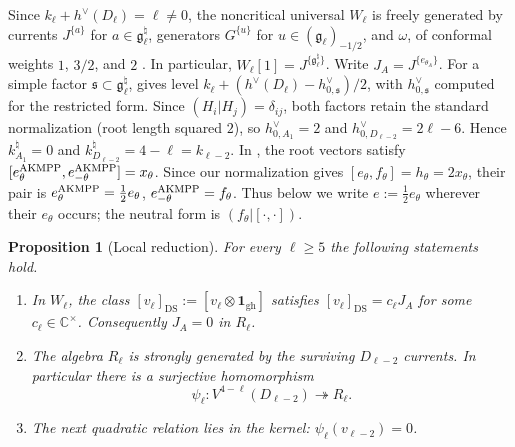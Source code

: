 \documentclass[11pt]{article}
\newtheorem{proposition}[theorem]{Proposition}
\newcommand{\g}{\mathfrak g}
\begin{document}
Since $k_\ell+h^\vee(D_\ell)=\ell\ne0$, the noncritical universal
$W_\ell$ is freely generated by currents $J^{\{a\}}$ for
$a\in\g_\ell^\natural$, generators $G^{\{u\}}$ for
$u\in(\g_\ell)_{-1/2}$, and $\omega$, of conformal weights $1$, $3/2$,
and $2$ \cite[p.~2 and Theorem~2.1]{AKMPPStructural}.  In particular,
$W_\ell[1]=J^{\{\g_\ell^\natural\}}$.  Write
$J_A=J^{\{e_{\theta_A}\}}$.
For a simple factor $\mathfrak s\subset\g_\ell^\natural$,
\cite[Theorem~2.1]{AKMPPStructural} gives level
$k_\ell+(h^\vee(D_\ell)-h^\vee_{0,\mathfrak s})/2$, with
$h^\vee_{0,\mathfrak s}$ computed for the restricted form.  Since
$(H_i|H_j)=\delta_{ij}$, both factors retain the standard normalization
(root length squared $2$), so $h^\vee_{0,A_1}=2$ and
$h^\vee_{0,D_{\ell-2}}=2\ell-6$.  Hence
$k^\natural_{A_1}=0$ and
$k^\natural_{D_{\ell-2}}=4-\ell=k_{\ell-2}$.
In \cite[\S2]{AKMPPStructural}, the root vectors satisfy
$[e_\theta^{\rm AKMPP},e_{-\theta}^{\rm AKMPP}]=x_\theta$.  Since our
normalization gives $[e_\theta,f_\theta]=h_\theta=2x_\theta$, their pair is
$e_\theta^{\rm AKMPP}=\tfrac12e_\theta$, $e_{-\theta}^{\rm AKMPP}=f_\theta$.
Thus below we write $e:=\tfrac12e_\theta$ wherever their $e_\theta$ occurs;
the neutral form is $(f_\theta|[\cdot,\cdot])$.

\begin{proposition}[Local reduction]\label{prop:local-reduction}
For every $\ell\ge5$ the following statements hold.
\begin{enumerate}[label=\textup{(\roman*)},leftmargin=2.2em]
\item In $W_\ell$, the class
$[v_\ell]_{\mathrm{DS}}:=[v_\ell\otimes\mathbf1_{\mathrm{gh}}]$ satisfies
$[v_\ell]_{\mathrm{DS}}=c_\ell J_A$ for some
$c_\ell\in\mathbb C^\times$.  Consequently $J_A=0$ in $R_\ell$.
\item The algebra $R_\ell$ is strongly generated by the surviving
$D_{\ell-2}$ currents.  In particular there is a surjective homomorphism
\begin{equation}\label{eq:universal-surj}
 \psi_\ell:V^{4-\ell}(D_{\ell-2})\twoheadrightarrow R_\ell.
\end{equation}
\item The next quadratic relation lies in the kernel:
$\psi_\ell(v_{\ell-2})=0$.
\end{enumerate}
\end{proposition}
\end{document}
